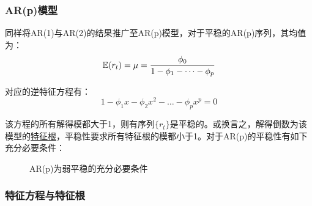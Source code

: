 \documentclass[11pt]{article}
\begin{document}
\subsubsection*{AR(p)模型}

同样将AR(1)与AR(2)的结果推广至AR(p)模型，对于平稳的AR(p)序列，其均值为：
\begin{equation*}
    \mathbb{E}(r_t) = \mu = \frac{\phi_0}{1 - \phi_1 - \dots - \phi_p}
\end{equation*}

对应的逆特征方程有：
\begin{equation*}
    1 - \phi_1 x - \phi_2 x^2 - \dots - \phi_p x^p= 0
\end{equation*}

该方程的所有解得模都大于1，则有序列$\{r_t\}$是平稳的。或换言之，解得倒数为该模型的\uline{特征根}，平稳性要求所有特征根的模都小于1。对于AR(p)的平稳性有如下充分必要条件：
\begin{figure}[H]
\centering
\caption{AR(p)为弱平稳的充分必要条件}
\end{figure}

\subsubsection*{特征方程与特征根}
\end{document}
